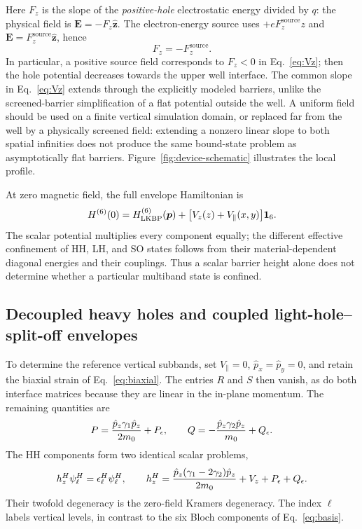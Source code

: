 Here $F_z$ is the slope of the \emph{positive-hole} electrostatic energy divided by $q$: the physical field is $\bm E=-F_z\hat{\bm z}$. The electron-energy source uses $+eF_z^{\mathrm{source}}z$ and $\bm E=F_z^{\mathrm{source}}\hat{\bm z}$, hence
\begin{equation}
F_z=-F_z^{\mathrm{source}}.
\label{eq:fieldswitch}
\end{equation}
In particular, a positive source field corresponds to $F_z<0$ in Eq.~\eqref{eq:Vz}; then the hole potential decreases towards the upper well interface. The common slope in Eq.~\eqref{eq:Vz} extends through the explicitly modeled barriers, unlike the screened-barrier simplification of a flat potential outside the well. A uniform field should be used on a finite vertical simulation domain, or replaced far from the well by a physically screened field: extending a nonzero linear slope to both spatial infinities does not produce the same bound-state problem as asymptotically flat barriers. Figure~\ref{fig:device-schematic} illustrates the local profile.

At zero magnetic field, the full envelope Hamiltonian is
\begin{equation}
H^{(6)}(0)=H_{\mathrm{LKBP}}^{(6)}(\bm p)
+\bigl[V_z(z)+V_\parallel(x,y)\bigr]\mathbf 1_6.
\label{eq:Htotalzero}
\end{equation}
The scalar potential multiplies every component equally; the different effective confinement of HH, LH, and SO states follows from their material-dependent diagonal energies and their couplings. Thus a scalar barrier height alone does not determine whether a particular multiband state is confined.

\subsection{Decoupled heavy holes and coupled light-hole--split-off envelopes}

To determine the reference vertical subbands, set $V_\parallel=0$, $ \hat{p}_ x= \hat{p}_ y=0$, and retain the biaxial strain of Eq.~\eqref{eq:biaxial}. The entries $R$ and $S$ then vanish, as do both interface matrices because they are linear in the in-plane momentum. The remaining quantities are
\begin{equation}
P=\frac{ \hat{p}_ z\gamma_1 \hat{p}_ z}{2m_0}+P_\epsilon,
\qquad
Q=-\frac{ \hat{p}_ z\gamma_2 \hat{p}_ z}{m_0}+Q_\epsilon.
\label{eq:PQvertical}
\end{equation}
The HH components form two identical scalar problems,
\begin{equation}
h_z^H\psi_\ell^H=\epsilon_\ell^H\psi_\ell^H,
\qquad
h_z^H=\frac{ \hat{p}_ z(\gamma_1-2\gamma_2) \hat{p}_ z}{2m_0}
+V_z+P_\epsilon+Q_\epsilon.
\label{eq:HHvertical}
\end{equation}
Their twofold degeneracy is the zero-field Kramers degeneracy. The index $\ell$ labels vertical levels, in contrast to the six Bloch components of Eq.~\eqref{eq:basis}.

